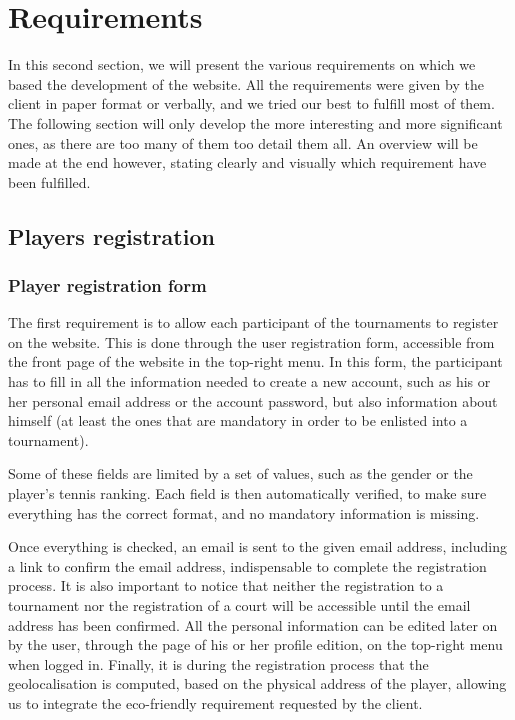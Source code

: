 \section{Requirements}
\label{sec:Requirements}


In this second section, we will present the various requirements on which we
based the development of the website. All the requirements were given by the
client in paper format or verbally, and we tried our best to fulfill most of
them. The following section will only develop the more interesting
and more significant ones, as there are too many of them too detail them all.
An overview will be made at the end however, stating clearly and visually which
requirement have been fulfilled.

\subsection{Players registration}
\label{sub:Players registration}

\subsubsection{Player registration form}
\label{subs:Registration form}


The first requirement is to allow each participant of the tournaments to
register on the website. This is done through the user registration form,
accessible from the front page of the website in the top-right menu.
In this form, the participant has to fill in all the information needed to
create a new account, such as his or her personal email address or the account
password, but also information about himself (at least the ones that
are mandatory in order to be enlisted into a tournament).\newline

Some of these fields are limited by a set of values, such as the gender or the
player's tennis ranking. Each field is then automatically verified, to make sure
everything has the correct format, and no mandatory information is missing.\newline

Once everything is checked, an email is sent to the given email address,
including a link to confirm the email address, indispensable to complete
the registration process. It is also important to notice that neither the
registration to a tournament nor the registration of a court will be accessible
until the email address has been confirmed. All the personal information can
be edited later on by the user, through the page of his or her profile edition,
on the top-right menu when logged in. Finally, it is during the registration
process that the geolocalisation is computed, based on the physical address
of the player, allowing us to integrate the eco-friendly requirement requested
by the client. \newline

